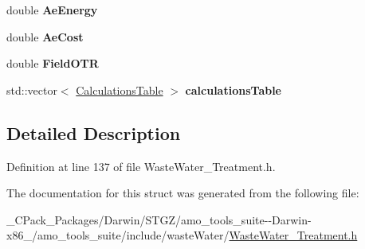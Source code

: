 \begin{DoxyCompactItemize}
double {\bfseries Ae\+Energy}
\item 
\mbox{\label{struct_waste_water___treatment_1_1_output_a6759123c79532dde4c88c7325fa8eb9a}} 
double {\bfseries Ae\+Cost}
\item 
\mbox{\label{struct_waste_water___treatment_1_1_output_a5a5cf857314f9c43533970a3a2cb5d30}} 
double {\bfseries Field\+O\+TR}
\item 
\mbox{\label{struct_waste_water___treatment_1_1_output_aa54bf0eb342847b01b75fe8b22e3f7c3}} 
std\+::vector$<$ \hyperlink{struct_waste_water___treatment_1_1_calculations_table}{Calculations\+Table} $>$ {\bfseries calculations\+Table}
\end{DoxyCompactItemize}


\subsection{Detailed Description}


Definition at line 137 of file Waste\+Water\+\_\+\+Treatment.\+h.



The documentation for this struct was generated from the following file\+:\begin{DoxyCompactItemize}
\item 
\+\_\+\+C\+Pack\+\_\+\+Packages/\+Darwin/\+S\+T\+G\+Z/amo\+\_\+tools\+\_\+suite-\/-\/\+Darwin-\/x86\+\_/amo\+\_\+tools\+\_\+suite/include/waste\+Water/\hyperlink{___c_pack___packages_2_darwin_2_s_t_g_z_2amo__tools__suite--_darwin-x86__64_2amo__tools__suite_2e397a2091b0b2529235d99ce4a62cd4a}{Waste\+Water\+\_\+\+Treatment.\+h}\end{DoxyCompactItemize}
